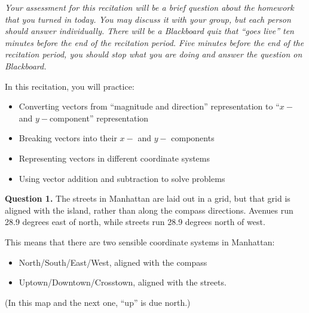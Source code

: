 \documentclass[12pt]{article}
\newcommand{\BI}{\begin{itemize}}
\newcommand{\EI}{\end{itemize}}
\def\BS{\bigskip}
\begin{document}
\Large
\centerline{}
\normalsize
\centerline{}

\it Your assessment for this recitation will be a brief question about the homework that you turned in today. You may discuss it with your group, but each person should answer individually. There will be a Blackboard quiz that ``goes live'' ten minutes before the end of the recitation period. Five minutes before the end of the recitation period, you should stop what you are doing and answer the question on Blackboard.

\rmfamily

\medskip

\rm In this recitation, you will practice:

\BI
\item Converting vectors from ``magnitude and direction'' representation to ``$x-$ and $y-$component'' representation
\item Breaking vectors into their $x-$ and $y-$ components
\item Representing vectors in different coordinate systems
\item Using vector addition and subtraction to solve problems
\EI
\newpage
\begin{minipage}{0.4\textwidth}
{\bf Question 1.} The streets in Manhattan are laid out in a grid, but that grid is aligned with the island, rather than along the compass directions. Avenues run 28.9 degrees east of north, while streets run 28.9 degrees north of west. 

\BS

This means that there are two sensible coordinate systems in Manhattan:


\BI
\item North/South/East/West, aligned with the compass
\item Uptown/Downtown/Crosstown, aligned with the streets.
\EI
	(In this map and the next one, “up” is due north.)

\end{minipage}
\end{document}
